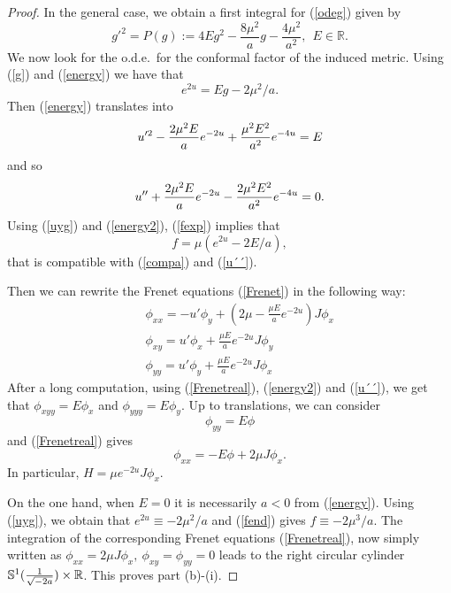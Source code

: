 \documentclass[leqno,11pt]{amsart}
\begin{document}
\begin{proof}
In the general case, we obtain a first integral for (\ref{odeg}) given by
\begin{equation}\label{energy}
g'^2=P(g):=4Eg^2-\frac{8\mu^2}{a}g-\frac{4\mu^2}{a^2}, \ \  E\in
{\mathbb{R}}.
\end{equation}
We now look for the o.d.e.\ for the conformal factor of the
induced metric. Using (\ref{g}) and (\ref{energy}) we have that
\begin{equation}\label{uyg}
e^{2u}=E g -2\mu^2/a .
\end{equation}
Then (\ref{energy}) translates into
\begin{equation}\label{energy2}
u'^2-{2\mu^2 E \over a}e^{-2u} + {\mu^2E^2 \over a^2}e^{-4u}=E
\end{equation}
and so
\begin{equation}\label{u´´}
u''+{2\mu^2 E \over a}e^{-2u}- {2\mu^2 E^2\over a^2} e^{-4u} =0.
\end{equation}
Using (\ref{uyg}) and (\ref{energy2}), (\ref{fexp}) implies that
\begin{equation}\label{fend}
f=\mu (e^{2u}-2E/a),
\end{equation}
that is compatible with (\ref{compa}) and (\ref{u´´}).

Then we can rewrite the Frenet equations (\ref{Frenet}) in the
following way:
\begin{eqnarray}\label{Frenetreal}
&& \phi_{xx}=-u' \phi_y +\left( 2\mu-\frac{\mu E}{a} e^{-2u} \right)J\phi_x\nonumber\\
&& \phi_{xy}=u' \phi_x + \frac{\mu E}{a} e^{-2u} J\phi_y\\
&& \phi_{yy}=u' \phi_y + \frac{\mu E}{a} e^{-2u} J\phi_x \nonumber
\end{eqnarray}
 After a long computation, using (\ref{Frenetreal}), (\ref{energy2}) and (\ref{u´´}),
we get that $ \phi_{xyy}=E \phi_x $ and $ \phi_{yyy}=E \phi_y $.
Up to translations, we can consider
\begin{equation}\label{Frenet1}
\phi_{yy}=E \phi
\end{equation}
and (\ref{Frenetreal}) gives
\begin{equation}\label{Frenet2}
\phi_{xx} = -E \phi + 2 \mu J\phi_x .
\end{equation}
In particular, $H=\mu e^{-2u}J\phi_x$.

On the one hand, when $E=0$ it is necessarily $a<0$ from
(\ref{energy}). Using (\ref{uyg}), we obtain that $e^{2u}\equiv
-2\mu^2/a$ and (\ref{fend}) gives $f\equiv -2\mu^3/a$. The
integration of the corresponding Frenet equations
(\ref{Frenetreal}), now simply written as $\phi_{xx}=2\mu J\phi_x,
\ \phi_{xy}=\phi_{yy}=0$ leads to the right circular cylinder
${\mathbb{S}}^1({1\over\sqrt{-2a}})\times {\mathbb{R}}$. This proves part (b)-(i).


\end{proof}
\end{document}
